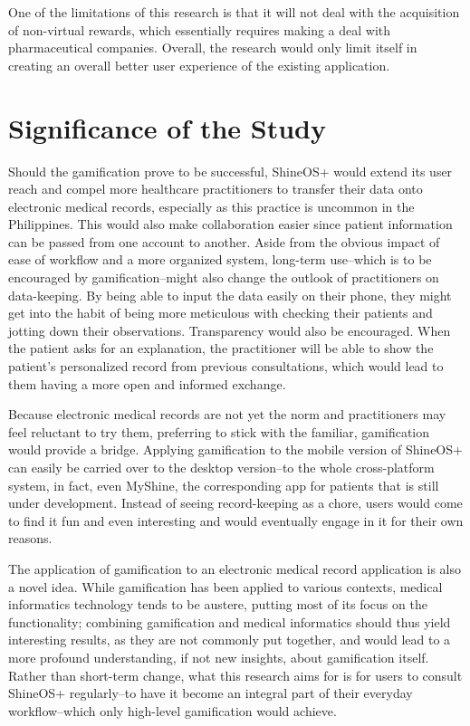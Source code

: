 One of the limitations of this research is that it will not deal with the acquisition of non-virtual rewards, which essentially requires making a deal with pharmaceutical companies. Overall, the research would only limit itself in creating an overall better user experience of the existing application.

\section{Significance of the Study}

Should the gamification prove to be successful, ShineOS+ would extend its user reach and compel more healthcare practitioners to transfer their data onto electronic medical records, especially as this practice is uncommon in the Philippines. This would also make collaboration easier since patient information can be passed from one account to another. Aside from the obvious impact of ease of workflow and a more organized system, long-term use--which is to be encouraged by gamification--might also change the outlook of practitioners on data-keeping. By being able to input the data easily on their phone, they might get into the habit of being more meticulous with checking their patients and jotting down their observations. Transparency would also be encouraged. When the patient asks for an explanation, the practitioner will be able to show the patient’s personalized record from previous consultations, which would lead to them having a more open and informed exchange.

Because electronic medical records are not yet the norm and practitioners may feel reluctant to try them, preferring to stick with the familiar, gamification would provide a bridge. Applying gamification to the mobile version of ShineOS+ can easily be carried over to the desktop version--to the whole cross-platform system, in fact, even MyShine, the corresponding app for patients that is still under development. Instead of seeing record-keeping as a chore, users would come to find it fun and even interesting and would eventually engage in it for their own reasons.

The application of gamification to an electronic medical record application is also a novel idea. While gamification has been applied to various contexts, medical informatics technology tends to be austere, putting most of its focus on the functionality; combining gamification and medical informatics should thus yield interesting results, as they are not commonly put together, and would lead to a more profound understanding, if not new insights, about gamification itself. Rather than short-term change, what this research aims for is for users to consult ShineOS+ regularly--to have it become an integral part of their everyday workflow--which only high-level gamification would achieve.
